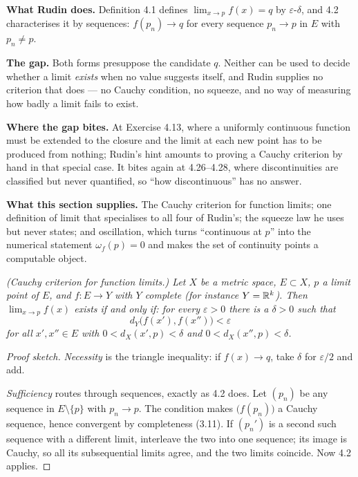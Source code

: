 
\begin{roadmap}
\raggedright
\textbf{What Rudin does.} Definition 4.1 defines $\lim_{x\to p}f(x)=q$ by
$\varepsilon$-$\delta$, and 4.2 characterises it by sequences: $f(p_n)\to q$
for every sequence $p_n \to p$ in $E$ with $p_n \ne p$.

\smallskip
\textbf{The gap.} Both forms presuppose the candidate $q$. Neither can be
used to decide whether a limit \emph{exists} when no value suggests itself,
and Rudin supplies no criterion that does --- no Cauchy condition, no
squeeze, and no way of measuring how badly a limit fails to exist.

\smallskip
\textbf{Where the gap bites.} At Exercise 4.13, where a uniformly continuous
function must be extended to the closure and the limit at each new point has
to be produced from nothing; Rudin's hint amounts to proving a Cauchy
criterion by hand in that special case. It bites again at 4.26--4.28, where
discontinuities are classified but never quantified, so ``how discontinuous''
has no answer.

\smallskip
\textbf{What this section supplies.} The Cauchy criterion for function
limits; one definition of limit that specialises to all four of Rudin's; the
squeeze law he uses but never states; and oscillation, which turns
``continuous at $p$'' into the numerical statement $\omega_f(p)=0$ and makes
the set of continuity points a computable object.
\end{roadmap}

\emph{(Cauchy criterion for function limits.) Let $X$ be a metric space, $E
\subset X$, $p$ a limit point of $E$, and $f : E \to Y$ with $Y$ complete
(for instance $Y = \mathbb{R}^k$). Then $\lim_{x\to p} f(x)$ exists if and only if:
for every $\varepsilon > 0$ there is a $\delta > 0$ such that}
\[ d_Y\bigl(f(x'),f(x'')\bigr) < \varepsilon \]
\emph{for all $x',x'' \in E$ with $0 < d_X(x',p) < \delta$ and
$0 < d_X(x'',p) < \delta$.}

\begin{proof}[Proof sketch]
\emph{Necessity} is the triangle inequality: if $f(x) \to q$, take $\delta$
for $\varepsilon/2$ and add.

\emph{Sufficiency} routes through sequences, exactly as 4.2 does. Let
$(p_n)$ be any sequence in $E \setminus \{p\}$ with $p_n \to p$. The condition
makes $\bigl(f(p_n)\bigr)$ a Cauchy sequence, hence convergent by
completeness (3.11). If $(p_n')$ is a second such sequence with a different
limit, interleave the two into one sequence; its image is Cauchy, so all its
subsequential limits agree, and the two limits coincide. Now 4.2 applies.
\end{proof}

